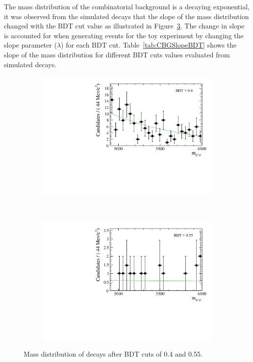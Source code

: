 {The mass distribution of the combinatorial background is a decaying exponential, it was observed from the simulated \bbbarmumux decays that the slope of the mass distribution changed with the BDT cut value as illustrated in Figure~\ref{fig:BDTmasses}. The change in slope is accounted for when generating events for the toy experiment by changing the slope parameter ($\lambda$) for each BDT cut. Table~\ref{tab:CBGSlopeBDT} shows the slope of the mass distribution for different BDT cuts values evaluated from \bbbarmumux simulated decays.

\begin{figure}
    \centering
    \begin{subfigure}[b]{0.4\textwidth}
        \includegraphics[width=\textwidth]{./Figs/Selection/BDT0p4.pdf}
        \caption{ }
        \label{fig:BDT0p4}
    \end{subfigure}
    ~ %
    \begin{subfigure}[b]{0.4\textwidth}
       \includegraphics[width=\textwidth]{./Figs/Selection/BDT0p55.pdf}
        \caption{ }
        \label{fig:BDT0p5}
    \end{subfigure}
    \caption{Mass distribution of \bbarmumux decays after BDT cuts of 0.4 and 0.55.}
    \label{fig:BDTmasses}
\end{figure}



}

